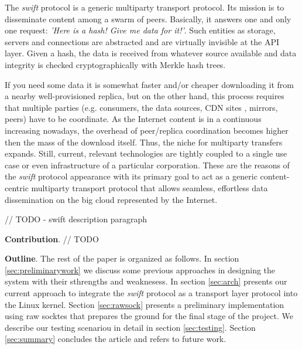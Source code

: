 
The \emph{swift} protocol is a generic multiparty transport protocol. Its mission is to disseminate content among a 
swarm of peers. Basically, it answers one and only one request: \emph{'Here is a hash! Give me data for it!'}. Such
entities as storage, servers and connections are abstracted and are virtually invisible at the API layer. Given a hash,
the data is received from whatever source available and data integrity is checked cryptographically with Merkle hash
trees.

If you need some data it is somewhat faster and/or cheaper downloading it from a nearby well-provisioned replica, but 
on the other hand, this process requires that multiple parties (e.g. consumers, the data sources, CDN
sites\cite{cdnwiki} , mirrors, peers) have to be coordinate. As the Internet content  is in a continuous increasing
nowadays, the overhead of peer/replica coordination becomes higher then the mass of the download itself. Thus, the niche
for multiparty transfers expands. Still, current, relevant technologies are tightly coupled to a single use case or even
infrastructure of a particular corporation. These are the reasons of the \emph{swift} protocol appearance with its
primary goal to act as a generic content-centric multiparty transport protocol that allows seamless, effortless data
dissemination on the big cloud represented by the Internet.

// TODO - swift description paragraph

\textbf{Contribution}. // TODO

\begin{comment}
Our main objective is to integrate \emph{swift} as a transport protocol in the Linux kernel
networking stack. This will provide notable performance improvement regarding data transfer. We intend to do this with
minimal intrusion effect in the Linux kernel and also to change as little as possible the current \emph{swift}
implementation. Another goal is to provide a transparent API between the kernel and the user space. A developer will use
a socket-like interface when building an application on top of the \emph{swift} protocol.
\end{comment}

\textbf{Outline}. The rest of the paper is organized as follows. In section \ref{sec:preliminarywork} we discuss some
previous approaches in designing the system with their sthrengths and weaknesess. In section \ref{sec:arch}
 presents our current approach to integrate the \emph{swift} protocol as a transport layer protocol into the Linux
kernel. Section \ref{sec:rawsock} presents a preliminary implementation using raw socktes that prepares the ground for
the final stage of the project.  We describe our testing scenariou in detail in section \ref{sec:testing}. Section
\ref{sec:summary} concludes the article and refers to future work.
